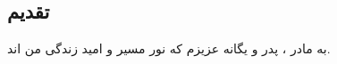 \titlepageParsi
\cleardoublepage

\clearpage

\begin{center}
    \section*{تقدیم}
    به مادر ، پدر و یگانه عزیزم که نور مسیر و امید زندگی من اند.
\end{center}
\clearpage
